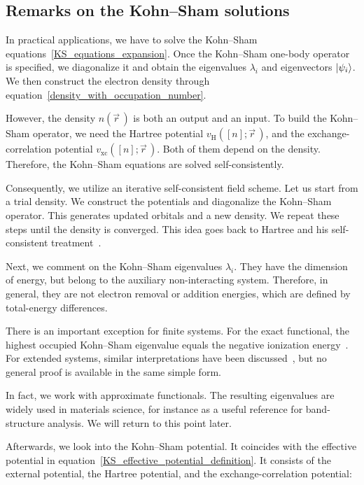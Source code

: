 \subsection{Remarks on the Kohn--Sham solutions}

In practical applications, we have to solve the Kohn--Sham equations~\eqref{KS_equations_expansion}.
Once the Kohn--Sham one-body operator is specified,
we diagonalize it and obtain the eigenvalues $\lambda_i$ and eigenvectors $\ket{\psi_i}$.
We then construct the electron density through equation~\eqref{density_with_occupation_number}.

However, the density $n(\vec{r}\,)$ is both an output and an input.
To build the Kohn--Sham operator, we need the Hartree potential $v_\mathrm{H}([n];\vec{r}\,)$,
and the exchange-correlation potential $v_\mathrm{xc}([n];\vec{r}\,)$.
Both of them depend on the density.
Therefore, the Kohn--Sham equations are solved self-consistently.

Consequently, we utilize an iterative self-consistent field scheme.
Let us start from a trial density.
We construct the potentials and diagonalize the Kohn--Sham operator.
This generates updated orbitals and a new density.
We repeat these steps until the density is converged.
This idea goes back to Hartree and his self-consistent treatment~\cite{hartree1928wave}.

Next, we comment on the Kohn--Sham eigenvalues $\lambda_i$.
They have the dimension of energy,
but belong to the auxiliary non-interacting system.
Therefore, in general, they are not electron removal or addition energies,
which are defined by total-energy differences.

There is an important exception for finite systems.
For the exact functional, the highest occupied Kohn--Sham eigenvalue equals the negative ionization energy~\cite{perdew1997comment, harbola1999relationship}.
For extended systems, similar interpretations have been discussed~\cite{mundt2006photoelectron},
but no general proof is available in the same simple form.

In fact, we work with approximate functionals.
The resulting eigenvalues are widely used in materials science, for instance as a useful reference for band-structure analysis.
We will return to this point later.

Afterwards, we look into the Kohn--Sham potential.
It coincides with the effective potential in equation~\eqref{KS_effective_potential_definition}.
It consists of the external potential, the Hartree potential, and the exchange-correlation potential:


